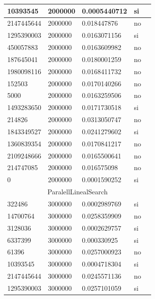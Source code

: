 \documentclass[12pt, fleqn]{article}                             %
\theoremstyle{break}                                            %
\begin{document}
\begin{longtable}{|m{5em}|m{5em}|m{10em}|m{5em}|@{}m{0pt}@{}}
            10393545& 2000000  & 0.0005440712 & si &\\[1em]    \hline
            2147445644& 2000000  & 0.018447876 & no &\\[1em]    \hline
            1295390003& 2000000  & 0.0163071156 & si &\\[1em]    \hline
            450057883& 2000000  & 0.0163609982 & no &\\[1em]    \hline
            187645041& 2000000  & 0.0180001259 & no &\\[1em]    \hline
            1980098116& 2000000  & 0.0168411732 & no &\\[1em]    \hline
            152503& 2000000  & 0.0170140266 & no &\\[1em]    \hline
            5000& 2000000  & 0.0163259506 & no &\\[1em]    \hline
            1493283650& 2000000  & 0.0171730518 & si &\\[1em]    \hline
            214826& 2000000  & 0.0313050747 & no &\\[1em]    \hline
            1843349527& 2000000  & 0.0241279602 & si &\\[1em]    \hline
            1360839354& 2000000  & 0.0170841217 & no &\\[1em]    \hline
            2109248666& 2000000  & 0.0165500641 & no &\\[1em]    \hline
            214747085& 2000000  & 0.016575098 & no &\\[1em]    \hline
            0& 2000000  & 0.0001590252 & si &\\[1em]    \hline
            \multicolumn{5}{|c|}{ParalellLinealSearch}   \\          \hline
            322486& 3000000  & 0.0002989769 & si &\\[1em]    \hline
            14700764& 3000000  & 0.0258359909 & no &\\[1em]    \hline
            3128036& 3000000  & 0.0002629757 & si &\\[1em]    \hline
            6337399& 3000000  & 0.000330925 & si &\\[1em]    \hline
            61396& 3000000  & 0.0257000923 & no &\\[1em]    \hline
            10393545& 3000000  & 0.0004718304 & si &\\[1em]    \hline
            2147445644& 3000000  & 0.0245571136 & no &\\[1em]    \hline
            1295390003& 3000000  & 0.0257101059 & si &\\[1em]    \hline

\end{longtable}
\end{document}
